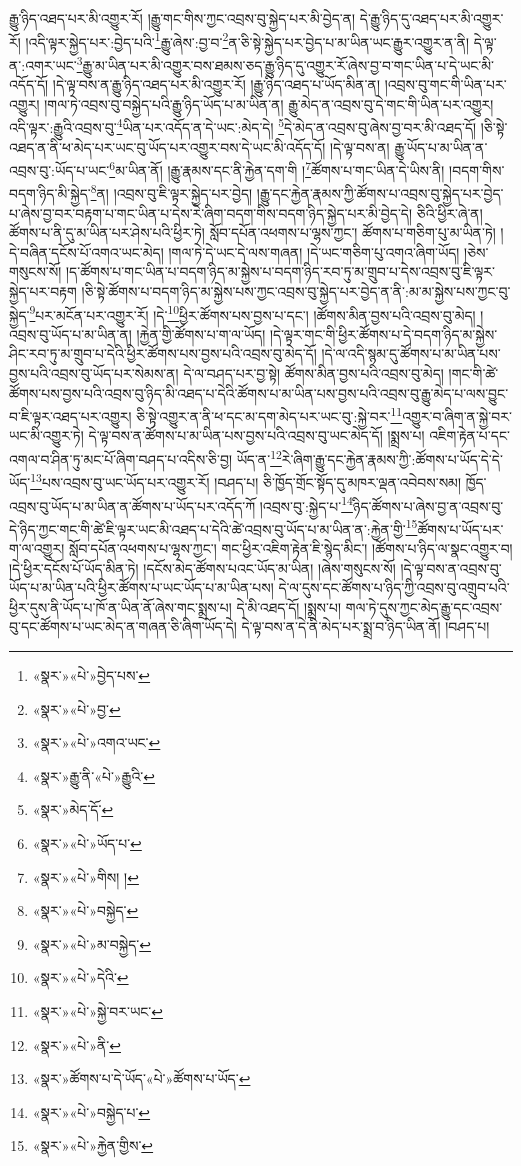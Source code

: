 རྒྱུ་ཉིད་འཐད་པར་མི་འགྱུར་རོ། །རྒྱུ་གང་གིས་ཀྱང་འབྲས་བུ་སྐྱེད་པར་མི་བྱེད་ན། དེ་རྒྱུ་ཉིད་དུ་འཐད་པར་མི་འགྱུར་རོ། །འདི་ལྟར་སྐྱེད་པར་:བྱེད་པའི་\footnote{«སྣར་»«པེ་»བྱེད་པས་}རྒྱུ་ཞེས་:བྱ་བ་\footnote{«སྣར་»«པེ་»བྱ་}ན་ཅི་སྟེ་སྐྱེད་པར་བྱེད་པ་མ་ཡིན་ཡང་རྒྱུར་འགྱུར་ན་ནི། དེ་ལྟ་ན་:འགར་ཡང་\footnote{«སྣར་»«པེ་»འགའ་ཡང་}རྒྱུ་མ་ཡིན་པར་མི་འགྱུར་བས་ཐམས་ཅད་རྒྱུ་ཉིད་དུ་འགྱུར་རོ་ཞེས་བྱ་བ་གང་ཡིན་པ་དེ་ཡང་མི་འདོད་དོ། །དེ་ལྟ་བས་ན་རྒྱུ་ཉིད་འཐད་པར་མི་འགྱུར་རོ། །རྒྱུ་ཉིད་འཐད་པ་ཡོད་མིན་ན། །འབྲས་བུ་གང་གི་ཡིན་པར་འགྱུར། །གལ་ཏེ་འབྲས་བུ་བསྐྱེད་པའི་རྒྱུ་ཉིད་ཡོད་པ་མ་ཡིན་ན། རྒྱུ་མེད་ན་འབྲས་བུ་དེ་གང་གི་ཡིན་པར་འགྱུར། འདི་ལྟར་:རྒྱུའི་འབྲས་བུ་\footnote{«སྣར་»རྒྱུ་ནི་«པེ་»རྒྱུའི་}ཡིན་པར་འདོད་ན་དེ་ཡང་:མེད་དེ། \footnote{«སྣར་»མེད་དོ་}དེ་མེད་ན་འབྲས་བུ་ཞེས་བྱ་བར་མི་འཐད་དོ། །ཅི་སྟེ་འཐད་ན་ནི་ཕ་མེད་པར་ཡང་བུ་ཡོད་པར་འགྱུར་བས་དེ་ཡང་མི་འདོད་དོ། །དེ་ལྟ་བས་ན། རྒྱུ་ཡོད་པ་མ་ཡིན་ན་འབྲས་བུ་:ཡོད་པ་ཡང་\footnote{«སྣར་»«པེ་»ཡོད་པ་}མ་ཡིན་ནོ། །རྒྱུ་རྣམས་དང་ནི་རྐྱེན་དག་གི །\footnote{«སྣར་»«པེ་»གིས། །}ཚོགས་པ་གང་ཡིན་དེ་ཡིས་ནི། །བདག་གིས་བདག་ཉིད་མི་སྐྱེད་\footnote{«སྣར་»«པེ་»བསྐྱེད་}ན། །འབྲས་བུ་ཇི་ལྟར་སྐྱེད་པར་བྱེད། །རྒྱུ་དང་རྐྱེན་རྣམས་ཀྱི་ཚོགས་པ་འབྲས་བུ་སྐྱེད་པར་བྱེད་པ་ཞེས་བྱ་བར་བརྟག་པ་གང་ཡིན་པ་དེས་རེ་ཞིག་བདག་གིས་བདག་ཉིད་སྐྱེད་པར་མི་བྱེད་དེ། ཅིའི་ཕྱིར་ཞེ་ན། ཚོགས་པ་ནི་དུ་མ་ཡིན་པར་ཤེས་པའི་ཕྱིར་ཏེ། སློབ་དཔོན་འཕགས་པ་ལྷས་ཀྱང་། ཚོགས་པ་གཅིག་པུ་མ་ཡིན་ཏེ། །དེ་བཞིན་དངོས་པོ་འགའ་ཡང་མེད། །གལ་ཏེ་དེ་ཡང་དེ་ལས་གཞན། །དེ་ཡང་གཅིག་པུ་འགའ་ཞིག་ཡོད། །ཅེས་གསུངས་སོ། །ད་ཚོགས་པ་གང་ཡིན་པ་བདག་ཉིད་མ་སྐྱེས་པ་བདག་ཉིད་རབ་ཏུ་མ་གྲུབ་པ་དེས་འབྲས་བུ་ཇི་ལྟར་སྐྱེད་པར་བརྟག །ཅི་སྟེ་ཚོགས་པ་བདག་ཉིད་མ་སྐྱེས་པས་ཀྱང་འབྲས་བུ་སྐྱེད་པར་བྱེད་ན་ནི་:མ་མ་སྐྱེས་པས་ཀྱང་བུ་སྐྱེད་\footnote{«སྣར་»«པེ་»མ་བསྐྱེད་}པར་མངོན་པར་འགྱུར་རོ། །དེ་\footnote{«སྣར་»«པེ་»དེའི་}ཕྱིར་ཚོགས་པས་བྱས་པ་དང་། །ཚོགས་མིན་བྱས་པའི་འབྲས་བུ་མེད། །འབྲས་བུ་ཡོད་པ་མ་ཡིན་ན། །རྐྱེན་གྱི་ཚོགས་པ་ག་ལ་ཡོད། །དེ་ལྟར་གང་གི་ཕྱིར་ཚོགས་པ་དེ་བདག་ཉིད་མ་སྐྱེས་ཤིང་རབ་ཏུ་མ་གྲུབ་པ་དེའི་ཕྱིར་ཚོགས་པས་བྱས་པའི་འབྲས་བུ་མེད་དོ། །དེ་ལ་འདི་སྙམ་དུ་ཚོགས་པ་མ་ཡིན་པས་བྱས་པའི་འབྲས་བུ་ཡོད་པར་སེམས་ན། དེ་ལ་བཤད་པར་བྱ་སྟེ། ཚོགས་མིན་བྱས་པའི་འབྲས་བུ་མེད། །གང་གི་ཚེ་ཚོགས་པས་བྱས་པའི་འབྲས་བུ་ཉིད་མི་འཐད་པ་དེའི་ཚོགས་པ་མ་ཡིན་པས་བྱས་པའི་འབྲས་བུ་རྒྱུ་མེད་པ་ལས་བྱུང་བ་ཇི་ལྟར་འཐད་པར་འགྱུར། ཅི་སྟེ་འགྱུར་ན་ནི་ཕ་དང་མ་དག་མེད་པར་ཡང་བུ་:སྐྱེ་བར་\footnote{«སྣར་»«པེ་»སྐྱེ་བར་ཡང་}འགྱུར་བ་ཞིག་ན་སྐྱེ་བར་ཡང་མི་འགྱུར་ཏེ། དེ་ལྟ་བས་ན་ཚོགས་པ་མ་ཡིན་པས་བྱས་པའི་འབྲས་བུ་ཡང་མེད་དོ། །སྨྲས་པ། འཇིག་རྟེན་པ་དང་འགལ་བ་ཤིན་ཏུ་མང་པོ་ཞིག་བཤད་པ་འདིས་ཅི་བྱ། ཡོད་ན་\footnote{«སྣར་»«པེ་»ནི་}རེ་ཞིག་རྒྱུ་དང་རྐྱེན་རྣམས་ཀྱི་:ཚོགས་པ་ཡོད་དེ་དེ་ཡོད་\footnote{«སྣར་»ཚོགས་པ་དེ་ཡོད་«པེ་»ཚོགས་པ་ཡོད་}པས་འབྲས་བུ་ཡང་ཡོད་པར་འགྱུར་རོ། །བཤད་པ། ཅི་ཁྱོད་གྲོང་སྟོད་དུ་མཁར་ལྡན་འབེབས་སམ། ཁྱོད་འབྲས་བུ་ཡོད་པ་མ་ཡིན་ན་ཚོགས་པ་ཡོད་པར་འདོད་ཀོ །འབྲས་བུ་:སྐྱེད་པ་\footnote{«སྣར་»«པེ་»བསྐྱེད་པ་}ཉིད་ཚོགས་པ་ཞེས་བྱ་ན་འབྲས་བུ་དེ་ཉིད་ཀྱང་གང་གི་ཚེ་ཇི་ལྟར་ཡང་མི་འཐད་པ་དེའི་ཚེ་འབྲས་བུ་ཡོད་པ་མ་ཡིན་ན་:རྐྱེན་གྱི་\footnote{«སྣར་»«པེ་»རྐྱེན་གྱིས་}ཚོགས་པ་ཡོད་པར་ག་ལ་འགྱུར། སློབ་དཔོན་འཕགས་པ་ལྷས་ཀྱང་། གང་ཕྱིར་འཇིག་རྟེན་ཇི་སྙེད་མིང་། །ཚོགས་པ་ཉིད་ལ་སྣང་འགྱུར་བ། །དེ་ཕྱིར་དངོས་པོ་ཡོད་མིན་ཏེ། །དངོས་མེད་ཚོགས་པའང་ཡོད་མ་ཡིན། །ཞེས་གསུངས་སོ། །དེ་ལྟ་བས་ན་འབྲས་བུ་ཡོད་པ་མ་ཡིན་པའི་ཕྱིར་ཚོགས་པ་ཡང་ཡོད་པ་མ་ཡིན་པས། དེ་ལ་དུས་དང་ཚོགས་པ་ཉིད་ཀྱི་འབྲས་བུ་འགྲུབ་པའི་ཕྱིར་དུས་ནི་ཡོད་པ་ཁོ་ན་ཡིན་ནོ་ཞེས་གང་སྨྲས་པ། དེ་མི་འཐད་དོ། །སྨྲས་པ། གལ་ཏེ་དུས་ཀྱང་མེད་རྒྱུ་དང་འབྲས་བུ་དང་ཚོགས་པ་ཡང་མེད་ན་གཞན་ཅི་ཞིག་ཡོད་དེ། དེ་ལྟ་བས་ན་དེ་ནི་མེད་པར་སྨྲ་བ་ཉིད་ཡིན་ནོ། །བཤད་པ། 